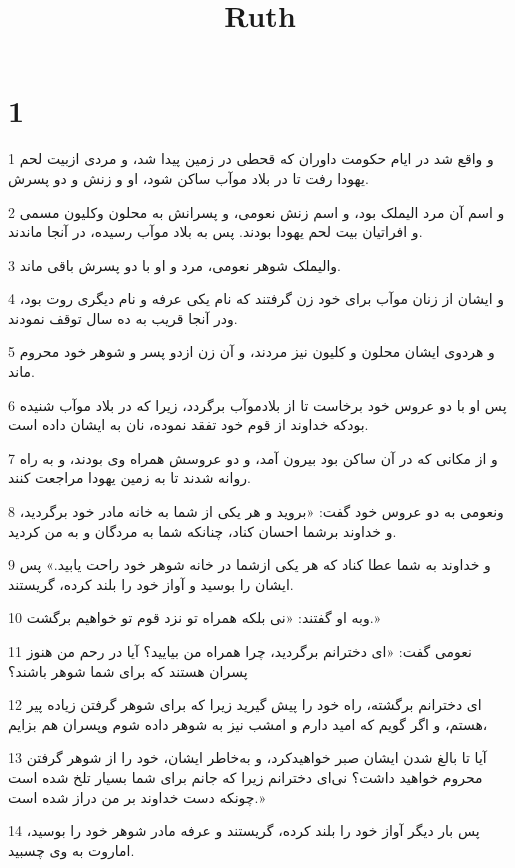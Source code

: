 

\title{Ruth}

 
\chapter{1}

\par 1 و واقع شد در ایام حکومت داوران که قحطی در زمین پیدا شد، و مردی ازبیت لحم یهودا رفت تا در بلاد موآب ساکن شود، او و زنش و دو پسرش.
\par 2 و اسم آن مرد الیملک بود، و اسم زنش نعومی، و پسرانش به محلون وکلیون مسمی و افراتیان بیت لحم یهودا بودند. پس به بلاد موآب رسیده، در آنجا ماندند.
\par 3 والیملک شوهر نعومی، مرد و او با دو پسرش باقی ماند.
\par 4 و ایشان از زنان موآب برای خود زن گرفتند که نام یکی عرفه و نام دیگری روت بود، ودر آنجا قریب به ده سال توقف نمودند.
\par 5 و هردوی ایشان محلون و کلیون نیز مردند، و آن زن ازدو پسر و شوهر خود محروم ماند.
\par 6 پس او با دو عروس خود برخاست تا از بلادموآب برگردد، زیرا که در بلاد موآب شنیده بودکه خداوند از قوم خود تفقد نموده، نان به ایشان داده است.
\par 7 و از مکانی که در آن ساکن بود بیرون آمد، و دو عروسش همراه وی بودند، و به راه روانه شدند تا به زمین یهودا مراجعت کنند.
\par 8 ونعومی به دو عروس خود گفت: «بروید و هر یکی از شما به خانه مادر خود برگردید، و خداوند برشما احسان کناد، چنانکه شما به مردگان و به من کردید.
\par 9 و خداوند به شما عطا کناد که هر یکی ازشما در خانه شوهر خود راحت یابید.» پس ایشان را بوسید و آواز خود را بلند کرده، گریستند.
\par 10 وبه او گفتند: «نی بلکه همراه تو نزد قوم تو خواهیم برگشت.»
\par 11 نعومی گفت: «ای دخترانم برگردید، چرا همراه من بیایید؟ آیا در رحم من هنوز پسران هستند که برای شما شوهر باشند؟
\par 12 ‌ای دخترانم برگشته، راه خود را پیش گیرید زیرا که برای شوهر گرفتن زیاده پیر هستم، و اگر گویم که امید دارم و امشب نیز به شوهر داده شوم وپسران هم بزایم،
\par 13 آیا تا بالغ شدن ایشان صبر خواهیدکرد، و به‌خاطر ایشان، خود را از شوهر گرفتن محروم خواهید داشت؟ نی‌ای دخترانم زیرا که جانم برای شما بسیار تلخ شده است چونکه دست خداوند بر من دراز شده است.»
\par 14 پس بار دیگر آواز خود را بلند کرده، گریستند و عرفه مادر شوهر خود را بوسید، اماروت به وی چسبید.
